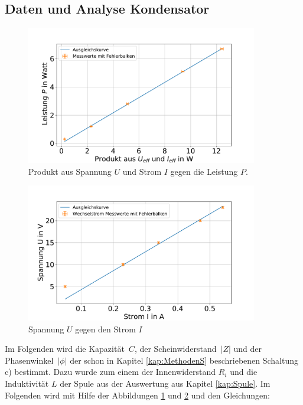 \FloatBarrier
\subsection{Daten und Analyse Kondensator}


\begin{figure}
	\centering
	\includegraphics[width=0.9\textwidth]{res/PgegenUIK.pdf}
	\caption{Produkt aus Spannung $U$ und Strom $I$ gegen die Leistung $P$.}
	\label{fig:PgegenUIK}
\end{figure}


\begin{figure}
	\centering
	\includegraphics[width=0.9\textwidth]{res/UgegenIK.pdf}
	\caption{Spannung $U$ gegen den Strom $I$}
	\label{fig:UgegenIK}
\end{figure}


Im Folgenden wird die Kapazität~$C$, der Scheinwiderstand~$|Z|$ und der Phasenwinkel~$|\phi| $ der schon in Kapitel \ref{kap:MethodenS} beschriebenen Schaltung c) bestimmt. 
Dazu wurde zum einem der Innenwiderstand $R_i$ und die Induktivität $L$ der Spule aus der Auswertung aus Kapitel \ref{kap:Spule}.
Im Folgenden wird mit Hilfe der Abbildungen \ref{fig:PgegenUIK} und \ref{fig:UgegenIK}
und den Gleichungen:

